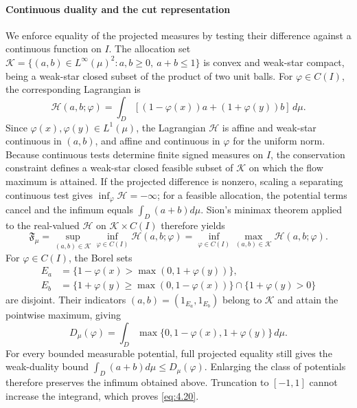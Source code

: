 \paragraph{Continuous duality and the cut representation}
We enforce equality of the projected measures by testing their difference against a continuous function on \(I\). The allocation set \(\mathcal K=\{(a,b)\in L^\infty(\mu)^2:a,b\ge0,\ a+b\le1\}\) is convex and weak-star compact, being a weak-star closed subset of the product of two unit balls. For \(\varphi\in C(I)\), the corresponding Lagrangian is
\[
\mathscr H(a,b;\varphi)
=\int_D[(1-\varphi(x))a+(1+\varphi(y))b]\,d\mu.
\]
Since \(\varphi(x),\varphi(y)\in L^1(\mu)\), the Lagrangian \(\mathscr H\) is affine and weak-star continuous in \((a,b)\), and affine and continuous in \(\varphi\) for the uniform norm. Because continuous tests determine finite signed measures on \(I\), the conservation constraint defines a weak-star closed feasible subset of \(\mathcal K\) on which the flow maximum is attained. If the projected difference is nonzero, scaling a separating continuous test gives \(\inf_\varphi\mathscr H=-\infty\); for a feasible allocation, the potential terms cancel and the infimum equals \(\int_D(a+b)d\mu\). Sion's minimax theorem \cite[Theorem 4.2]{sion1958} applied to the real-valued \(\mathscr H\) on \(\mathcal K\times C(I)\) therefore yields
\[
\mathfrak F_\mu
=\sup_{(a,b)\in\mathcal K}\inf_{\varphi\in C(I)}\mathscr H(a,b;\varphi)
=\inf_{\varphi\in C(I)}\max_{(a,b)\in\mathcal K}\mathscr H(a,b;\varphi).
\]
For \(\varphi\in C(I)\), the Borel sets
\[
\begin{aligned}
E_a&=\{1-\varphi(x)>\max(0,1+\varphi(y))\},\\
E_b&=\{1+\varphi(y)\ge\max(0,1-\varphi(x))\}
      \cap\{1+\varphi(y)>0\}
\end{aligned}
\]
are disjoint. Their indicators \((a,b)=(1_{E_a},1_{E_b})\) belong to \(\mathcal K\) and attain the pointwise maximum, giving
\begin{equation}
D_\mu(\varphi)=\int_D\max\{0,1-\varphi(x),1+\varphi(y)\}\,d\mu.
\tag{A.58}\label{eq:A.58}
\end{equation}
For every bounded measurable potential, full projected equality still gives the weak-duality bound \(\int_D(a+b)d\mu\le D_\mu(\varphi)\). Enlarging the class of potentials therefore preserves the infimum obtained above. Truncation to \([-1,1]\) cannot increase the integrand, which proves \eqref{eq:4.20}.

